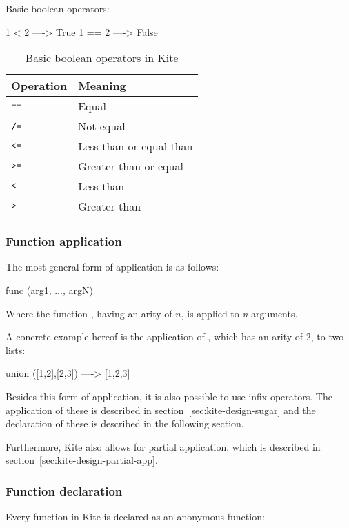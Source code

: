 Basic boolean operators:
\begin{kite}
1 < 2  ----> True
1 == 2 ----> False
\end{kite}

\begin{table}[H]
  \centering
  \begin{tabular}{ll}
    \textbf{Operation} & \textbf{Meaning} \\ \hline
    $\texttt{==}$ & Equal                   \\ \hline
    $\texttt{/=}$ & Not equal               \\ \hline
    $\texttt{<=}$ & Less than or equal than \\ \hline
    $\texttt{>=}$ & Greater than or equal   \\ \hline
    $\texttt{<}$  & Less than               \\ \hline
    $\texttt{>}$  & Greater than            \\ \hline
  \end{tabular}
  \caption{Basic boolean operators in Kite}
\label{tbl:kite-disign-bool-op}
\end{table}

\subsubsection{Function application}
\label{sec:kite-design-func-app}
The most general form of application is as follows:
\begin{kite}
func (arg1, ..., argN)
\end{kite}

Where the function , having an arity of $n$, is applied to \emph{n} arguments.

A concrete example hereof is the application of , which has an arity of 2, to two lists:
\begin{kite}
union ([1,2],[2,3]) ----> [1,2,3]
\end{kite}

Besides this form of application, it is also possible to use infix operators. The application of these is described in section~\ref{sec:kite-design-sugar} and the declaration of these is described in the following section.

Furthermore, Kite also allows for partial application, which is described in section~\ref{sec:kite-design-partial-app}.

\subsubsection{Function declaration}
\label{sec:func-decl}
Every function in Kite is declared as an anonymous function:


